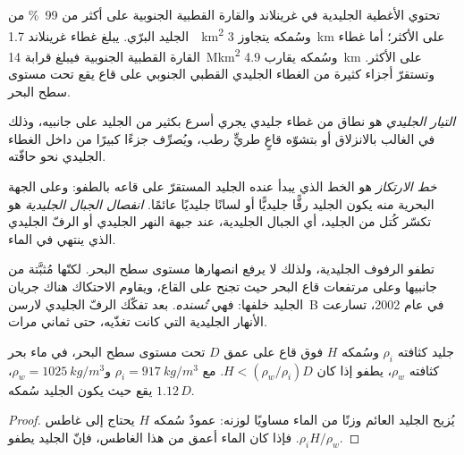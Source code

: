 تحتوي الأغطية الجليدية في غرينلاند والقارة القطبية الجنوبية على أكثر من
\qty{99}{\percent} من الجليد البرّي. يبلغ غطاء غرينلاند \qty{1.7}{\mega
km^2} وسُمكه يتجاوز \qty{3}{km} على الأكثر؛ أما غطاء القارة القطبية الجنوبية فيبلغ
قرابة \qty{14}{\mega km^2} وسُمكه يقارب \qty{4.9}{km} على الأكثر. وتستقرّ أجزاء كثيرة
من الغطاء الجليدي القطبي الجنوبي على قاع يقع تحت مستوى سطح البحر.

\begin{definition}\label{def:b3:glaciology:ice-stream}
\emph{التيار الجليدي} هو نطاق من غطاء جليدي يجري
أسرع بكثير من الجليد على جانبيه، وذلك في الغالب بالانزلاق أو بتشوّه
قاعٍ طريٍّ رطب، ويُصرِّف جزءًا كبيرًا من داخل الغطاء الجليدي
نحو حافّته.
\end{definition}

\begin{definition}\label{def:b3:glaciology:grounding-line}
\emph{خط الارتكاز} هو الخط الذي يبدأ عنده الجليد
المستقرّ على قاعه بالطفو: وعلى الجهة البحرية منه يكون الجليد رفًّا جليديًّا
أو لسانًا جليديًا عائمًا. \emph{انفصال الجبال الجليدية} هو تكسّر
كُتل من الجليد، أي الجبال الجليدية، عند جبهة النهر الجليدي أو الرفّ الجليدي
الذي ينتهي في الماء.
\end{definition}

تطفو الرفوف الجليدية، ولذلك لا يرفع انصهارها مستوى سطح البحر. لكنّها
مُثبَّتة من جانبيها وعلى مرتفعات قاع البحر حيث تجنح
على القاع، ويقاوم الاحتكاك هناك جريان الجليد خلفها: فهي
\emph{تُسنده}. بعد تفكّك الرفّ الجليدي لارسن~B في عام 2002، تسارعت
الأنهار الجليدية التي كانت تغذّيه، حتى ثماني مرات.

\begin{proposition}[الطفو]\label{prop:b3:glaciology:flotation}
جليد كثافته $\rho_i$ وسُمكه $H$ فوق قاع على عمق $D$ تحت مستوى سطح البحر،
في ماء بحر كثافته $\rho_w$، يطفو إذا كان $H < (\rho_w/\rho_i)D$.
مع $\rho_i = \qty{917}{kg/m^3}$ و$\rho_w = \qty{1025}{kg/m^3}$، يقع
 حيث يكون الجليد سُمكه $1.12\,D$.
\end{proposition}

\begin{proof}
يُزيح الجليد العائم وزنًا من الماء مساويًا لوزنه: عمودٌ سُمكه $H$
يحتاج إلى غاطس $\rho_iH/\rho_w$. فإذا كان الماء أعمق من هذا الغاطس،
فإنّ الجليد يطفو.
\end{proof}

